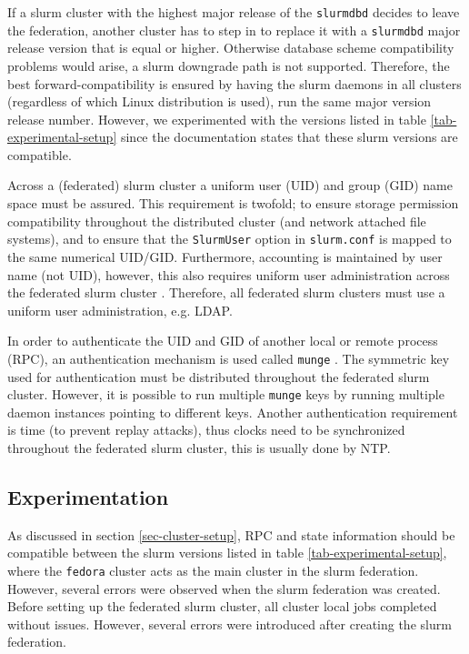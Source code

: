 \documentclass[conference]{IEEEtran}
\begin{document}
If a \gls{slurm} cluster with the highest major release of the \texttt{slurmdbd} decides to leave the federation, another cluster has to step in to replace it with a \texttt{slurmdbd} major release version that is equal or higher. Otherwise database scheme compatibility problems would arise, a \gls{slurm} downgrade path is not supported. Therefore, the best forward-compatibility is ensured by having the \gls{slurm} daemons in all clusters (regardless of which Linux distribution is used), run the same major version release number. However, we experimented with the versions listed in table \ref{tab-experimental-setup} since the documentation states that these \gls{slurm} versions are compatible.

Across a (federated) \gls{slurm} cluster a uniform user (UID) and group (GID) name space must be assured. This requirement is twofold; to ensure storage permission compatibility throughout the distributed cluster (and network attached file systems), and to ensure that the \texttt{SlurmUser} option in \texttt{slurm.conf} is mapped to the same numerical UID/GID. Furthermore, accounting is maintained by user name (not UID), however, this also requires uniform user administration across the federated \gls{slurm} cluster \cite{slurm-accounting}. Therefore, all federated \gls{slurm} clusters must use a uniform user administration, e.g. LDAP.

In order to authenticate the UID and GID of another local or remote process (RPC), an authentication mechanism is used called \texttt{munge} \cite{github-munge}. The symmetric key used for authentication must be distributed throughout the federated \gls{slurm} cluster. However, it is possible to run multiple \texttt{munge} keys by running multiple daemon instances pointing to different keys. Another authentication requirement is time (to prevent replay attacks), thus clocks need to be synchronized throughout the federated \gls{slurm} cluster, this is usually done by NTP.


\subsection{Experimentation}
As discussed in section \ref{sec-cluster-setup}, RPC and state information should be compatible between the \gls{slurm} versions listed in table \ref{tab-experimental-setup}, where the \texttt{fedora} cluster acts as the main cluster in the \gls{slurm} federation. However, several errors were observed when the \gls{slurm} federation was created. Before setting up the federated \gls{slurm} cluster, all cluster local jobs completed without issues. However, several errors were introduced after creating the \gls{slurm} federation.
\end{document}
